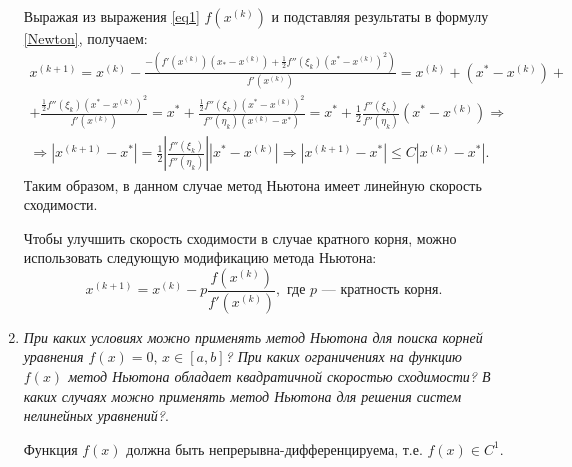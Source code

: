 \documentclass[12pt, a4paper]{article}
\begin{document}
\begin{enumerate}
	Выражая из выражения \eqref{eq1} $f(x^{(k)})$ и подставляя результаты в формулу \eqref{Newton}, получаем:
	\begin{multline*}
		x^{(k+1)} = x^{(k)} - \frac{-\left(f'(x^{(k)}) (x_*-x^{(k)}) + \frac12 f''(\xi_k) (x^*-x^{(k)})^2\right)}{f'(x^{(k)})} = x^{(k)} + (x^* - x^{(k)}) +\\
		+\frac{\frac12 f''(\xi_k) (x^*-x^{(k)})^2}{f'(x^{(k)})} = x^* + \frac{\frac12 f''(\xi_k) (x^*-x^{(k)})^2}{f''(\eta_k) (x^{(k)}-x^*)} = x^* + \frac12 \frac{f''(\xi_k)}{f''(\eta_k)} (x^* - x^{(k)}) \Rightarrow \\
		\Rightarrow |x^{(k+1)} - x^*| = \frac12 \left|\frac{f''(\xi_k)}{f''(\eta_k)}\right| |x^* - x^{(k)}| \Rightarrow |x^{(k+1)} - x^*| \le C | x^{(k)} - x^*|.
	\end{multline*}
	Таким образом, в данном случае метод Ньютона имеет линейную скорость сходимости.
	
	Чтобы улучшить скорость сходимости в случае кратного корня, можно использовать следующую модификацию метода Ньютона:
	\[
	x^{(k+1)} = x^{(k)} - p \frac{f(x^{(k)})}{f'(x^{(k)})}, \text{ где $p$ --- кратность корня}.
	\]
		
		\item \textit{При каких условиях можно применять метод Ньютона для
			поиска корней уравнения $f(x)=0,\, x \in [a,b]$? При каких ограничениях
			на функцию $f (x)$ метод Ньютона обладает квадратичной
			скоростью сходимости? В каких случаях можно применять метод Ньютона для решения систем нелинейных уравнений?}.
		\smallskip
		
		Функция $f(x)$ должна быть непрерывна-дифференцируема, т.е. $f(x)\in C^1$.
		

\end{enumerate}
\end{document}

